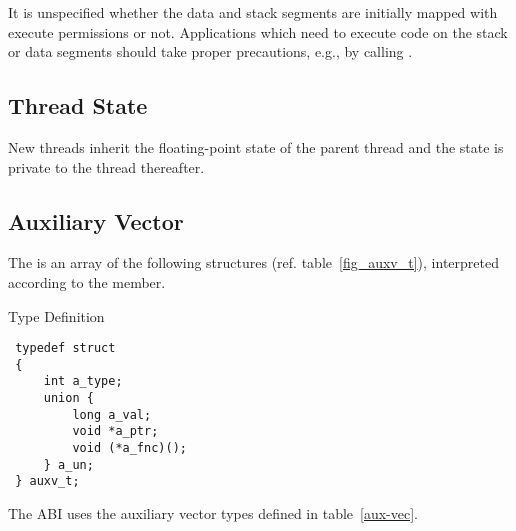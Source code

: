 It is unspecified whether 
the data and stack segments are initially mapped with
execute permissions or not.
Applications which need to execute code on the stack or data
segments should take proper precautions, e.g., by calling
.

\subsection{Thread State}

New threads inherit the floating-point state of the parent thread
and the state is private to the thread thereafter.

\subsection{Auxiliary Vector}

The  is an array of the following structures
(ref. table~\ref{fig_auxv_t}),
interpreted according to the  member.

\begin{table}[H]
\Hrule
\caption{ Type Definition}
\label{fig_auxv_t}
\begin{center}
\begin{verbatim}
 typedef struct
 {
     int a_type;
     union {
         long a_val;
         void *a_ptr;
         void (*a_fnc)();
     } a_un;
 } auxv_t;
\end{verbatim}
\end{center}
\Hrule
\end{table}

The \xARCH ABI uses the auxiliary vector types defined in table~\ref{aux-vec}.

